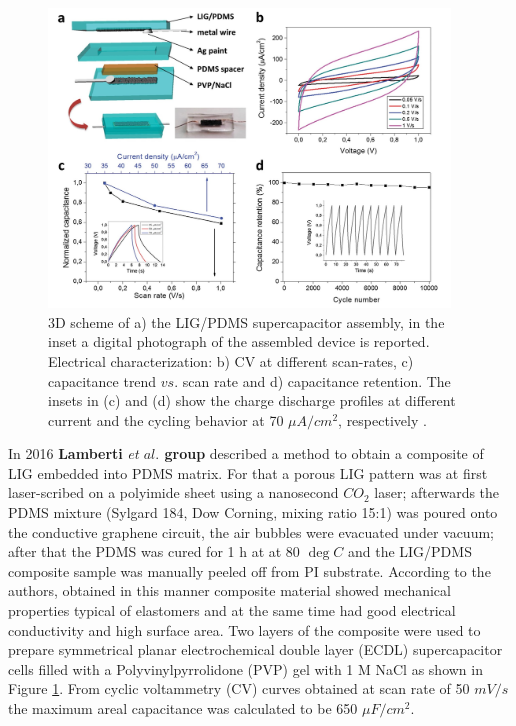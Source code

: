 \begin{figure}[H]
\centering
\includegraphics[width=0.95\textwidth]{Figures/Theory/Lamberti_PDMS_LIG_2016.jpg}
\medskip
\captionsetup{width=0.9\linewidth}
\caption{3D scheme of a) the LIG/PDMS supercapacitor assembly, in the inset a digital photograph of the assembled device is reported. Electrical characterization: b) CV at different scan-rates, c) capacitance trend $vs.$ scan rate and d) capacitance retention. The insets in (c) and (d) show the charge discharge profiles at different current and the cycling behavior at 70 $\mu A/cm^2$, respectively \cite{lamberti_highly_2016}.}
\label{fig:LIG_PDMS_Lamberti_2016}
\end{figure}

In 2016 \textbf{Lamberti $et \; al.$ \cite{lamberti_highly_2016} group} described a method to obtain a composite of LIG embedded into PDMS matrix. For that a porous LIG pattern was at first laser-scribed on a polyimide sheet using a nanosecond $CO_2$ laser; afterwards the PDMS mixture (Sylgard 184, Dow Corning, mixing ratio 15:1) was poured onto the conductive graphene circuit, the air bubbles were evacuated under vacuum; after that the PDMS was cured for 1 h at at 80 $\deg C$ and the LIG/PDMS composite sample was manually peeled off from PI substrate. According to the authors, obtained in this manner composite material showed mechanical properties typical of elastomers and at the same time had good electrical conductivity and high surface area. Two layers of the composite were used to prepare symmetrical planar electrochemical double layer (ECDL) supercapacitor cells filled with a Polyvinylpyrrolidone (PVP) gel with 1 M NaCl as shown in Figure \ref{fig:LIG_PDMS_Lamberti_2016}. From cyclic voltammetry (CV) curves obtained at scan rate of 50 $mV/s$ the maximum areal capacitance was calculated to be 650 $\mu F/cm^2$. 
 
